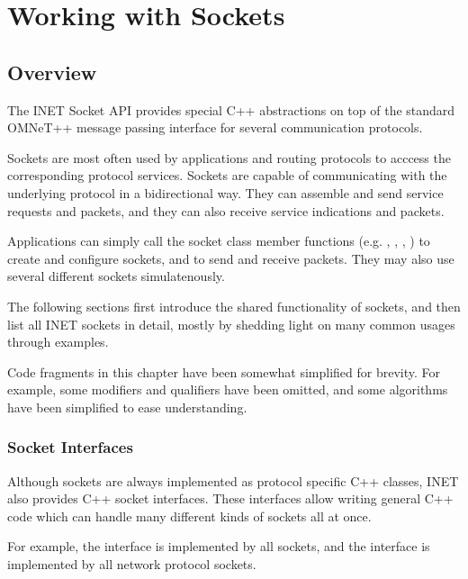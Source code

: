\chapter{Working with Sockets}
\label{cha:sockets}

\section{Overview}

The INET Socket API provides special C++ abstractions on top of the standard
OMNeT++ message passing interface for several communication protocols.

Sockets are most often used by applications and routing protocols to acccess the
corresponding protocol services. Sockets are capable of communicating with the
underlying protocol in a bidirectional way. They can assemble and send service
requests and packets, and they can also receive service indications and packets.

Applications can simply call the socket class member functions (e.g.
, , , ) to create
and configure sockets, and to send and receive packets. They may also use
several different sockets simulatenously.

The following sections first introduce the shared functionality of sockets, and
then list all INET sockets in detail, mostly by shedding light on many common
usages through examples.

\begin{note}
Code fragments in this chapter have been somewhat simplified for brevity. For
example, some  modifiers and  qualifiers have been
omitted, and some algorithms have been simplified to ease understanding.
\end{note}

\subsection*{Socket Interfaces}

Although sockets are always implemented as protocol specific C++ classes, INET
also provides C++ socket interfaces. These interfaces allow writing general C++
code which can handle many different kinds of sockets all at once.

For example, the  interface is implemented by all sockets, and
the  interface is implemented by all network protocol
sockets.

